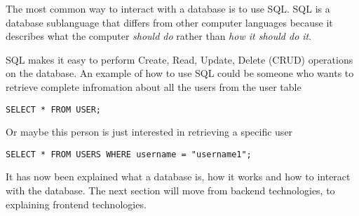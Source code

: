 \documentclass[../../master.tex]{subfiles}
\begin{document}
The most common way to interact with a database is to use SQL.
SQL is a database sublanguage that differs from other computer languages because it describes what the computer \textit{should do} rather than \textit{how it should do it}.\cite{SQLIntroduction}

SQL makes it easy to perform Create, Read, Update, Delete (CRUD) operations on the database.\cite{OracleWhatIsDatabase}
An example of how to use SQL could be someone who wants to retrieve complete infromation about all the users from the user table

\begin{lstlisting}[caption={An SQL query that fetches complete information for every user}, label=lstSQL-user1]
SELECT * FROM USER;
\end{lstlisting}

Or maybe this person is just interested in retrieving a specific user

\begin{lstlisting}[caption={An SQL query that only fetches complete information for username1}, label=lstSQL-user2]
SELECT * FROM USERS WHERE username = "username1";
\end{lstlisting}

It has now been explained what a database is, how it works and how to interact with the database.
The next section will move from backend technologies, to explaining frontend technologies.
\end{document}
